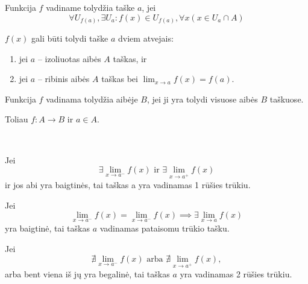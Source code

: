 \begin{defn}
  Funkcija $f$ vadiname tolydžia taške $a$, jei 
  \begin{equation*}
    \forall U_{f(a)}, \exists U_{a} : 
      f(x) \in U_{f(a)}, \forall x (x \in U_{a} \cap A)
  \end{equation*}
\end{defn}

$f(x)$ gali būti tolydi taške $a$ dviem atvejais:
\begin{enumerate}
  \item jei $a$ – izoliuotas aibės $A$ taškas, ir 
  \item jei $a$ – ribinis aibės $A$ taškas bei 
    $\lim _{x \to a} f(x) = f(a)$.
\end{enumerate}

\begin{defn}
  Funkcija $f$ vadinama tolydžia aibėje $B$, jei ji yra tolydi visuose
  aibės $B$ taškuose.
\end{defn}

\begin{note}
  Toliau $f: A \to B$ ir $a \in A$.
\end{note}

\begin{defn}
  \begin{description}
    \hfill \\
    \item[1 rūšies trūkis] Jei 
      \begin{equation*}
        \exists \lim _{x \to a^{-}} f(x) 
        \text{ ir }
        \exists \lim _{x \to a^{+}} f(x) 
      \end{equation*}
       ir jos abi yra baigtinės, tai
      taškas a yra vadinamas 1 rūšies trūkiu.
    \item[pataisomas trūkis] Jei
      \begin{equation*}
        \lim _{x \to a^{-}} f(x) = \lim _{x \to a^{-}} f(x) 
        \implies \exists \lim _{x \to a} f(x)
      \end{equation*}
      yra baigtinė, tai taškas $a$ vadinamas pataisomu trūkio tašku.
    \item[2 rūšies trūkis] Jei
      \begin{equation*}
        \nexists \lim _{x \to a^{-}} f(x)
        \text{ arba }
        \nexists \lim _{x \to a^{+}} f(x),
      \end{equation*}
      arba bent viena iš jų yra begalinė, tai taškas $a$ yra vadinamas
      2 rūšies trūkiu.
  \end{description}
\end{defn}

